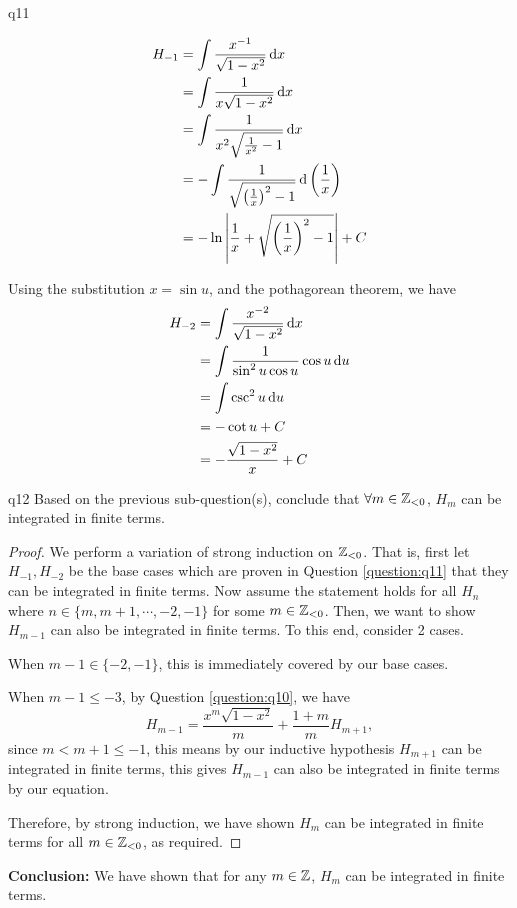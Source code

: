 \documentclass[reqno]{alittlebear}
\begin{document}
\begin{exercise}{}{}
\begin{question}{}{q11}
    
    \begin{mathnote}
        \begin{align*}
            H_{-1}&=\int \frac{x^{-1}}{\sqrt{1-x^2}}\mathop{}\!\mathrm{d} x\\
            &=\int \frac{1}{x\sqrt{1-x^2}}\mathop{}\!\mathrm{d} x\\
            &=\int \frac{1}{x^2\sqrt{\frac1{x^2}-1}}\mathop{}\!\mathrm{d} x\\
            &=-\int \frac{1}{\sqrt{\left(\frac1x\right)^2-1}}\mathop{}\!\mathrm{d}\left(\frac1x\right)\\
            &=-\ln\left|\frac1x+\sqrt{\left(\frac1x\right)^2-1}\right|+C
        \end{align*}
    \end{mathnote}
    \begin{mathnote}
        Using the substitution $x=\sin u$, and the pothagorean theorem, we have
        \begin{align*} 
            H_{-2}&=\int \frac{x^{-2}}{\sqrt{1-x^2}}\mathop{}\!\mathrm{d} x\\
            &=\int \frac{1}{\sin^2 u \cos u}\cos u \mathop{}\!\mathrm{d} u\\
            &=\int \csc ^2 u \mathop{}\!\mathrm{d} u\\
            &=-\cot u + C\\
            &=-\frac{\sqrt{1-x^2}}{x}+C
        \end{align*}
        
    \end{mathnote}

\end{question}


\begin{question}{}{q12}
    Based on the previous sub-question(s), conclude that $\forall m\in\mathbb{Z}_{<0}$, $H_m$ can be integrated in finite terms.
    \qbreak
    \begin{proof}
        We perform a variation of strong induction on $\mathbb{Z}_{<0}$. That is, first let $H_{-1}, H_{-2}$ be the base cases which are proven in Question \ref{question:q11} that they can be integrated in finite terms. Now assume the statement holds for all $H_n$ where $n\in\{m,m+1,\cdots,-2,-1\}$ for some $m\in\mathbb{Z}_{<0}$. Then, we want to show $H_{m-1}$ can also be integrated in finite terms. To this end, consider 2 cases.

        When $m-1\in\{-2,-1\}$, this is immediately covered by our base cases. 
        
        When $m-1\leq-3$, by Question \ref{question:q10}, we have \[H_{m-1}=\frac{x^{m}\sqrt{1-x^2}}{m}+\frac{1+m}{m}H_{m+1},\] since $m<m+1\leq-1$, this means by our inductive hypothesis $H_{m+1}$ can be integrated in finite terms, this gives $H_{m-1}$ can also be integrated in finite terms by our equation.

        Therefore, by strong induction, we have shown $H_m$ can be integrated in finite terms for all $m\in\mathbb{Z}_{<0}$, as required.
    \end{proof}
\end{question}
\begin{note}
    \textbf{Conclusion:} We have shown that for any $m\in\mathbb{Z}$, $H_m$ can be integrated in finite terms. 
\end{note}
\end{exercise}
\end{document}
